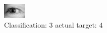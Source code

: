\begin{figure}[h!]
\begin{center}
\includegraphics[width=0.60\columnwidth]{figures/ID3107_class_3_target_4.png}
\end{center}
\caption{ Classification: 3 actual target: 4}
\label{fig:ID3107_class_3_target_4}
\end{figure}
